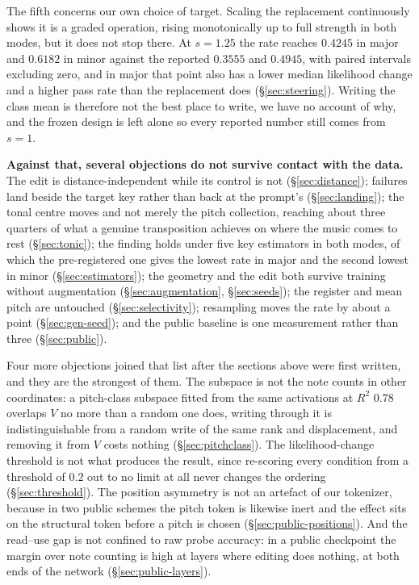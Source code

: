 \documentclass{article}
\begin{document}
The fifth concerns our own choice of target. Scaling the replacement continuously shows
it is a graded operation, rising monotonically up to full strength in both modes, but it
does not stop there. At $s=1.25$ the rate reaches $0.4245$ in major and $0.6182$ in
minor against the reported $0.3555$ and $0.4945$, with paired intervals excluding zero,
and in major that point also has a lower median likelihood change and a higher pass rate
than the replacement does (\S\ref{sec:steering}). Writing the class mean is therefore
not the best place to write, we have no account of why, and the frozen design is left
alone so every reported number still comes from $s=1$.

\textbf{Against that, several objections do not survive contact with the data.} The
edit is distance-independent while its control is not (\S\ref{sec:distance}); failures
land beside the target key rather than back at the prompt's (\S\ref{sec:landing});
the tonal centre moves and not merely the pitch collection, reaching about
three quarters of what a genuine transposition achieves on where the music comes to
rest (\S\ref{sec:tonic}); the finding holds under five key estimators in both modes, of
which the pre-registered one gives the lowest rate in major and the second lowest in
minor (\S\ref{sec:estimators}); the geometry and the
edit both survive training without augmentation (\S\ref{sec:augmentation},
\S\ref{sec:seeds}); the register and mean pitch are untouched (\S\ref{sec:selectivity});
resampling moves the rate by about a point (\S\ref{sec:gen-seed}); and the public
baseline is one measurement rather than three (\S\ref{sec:public}).

Four more objections joined that list after the sections above were first written, and
they are the strongest of them. The subspace is not the note counts in other
coordinates: a pitch-class subspace fitted from the same activations at $R^2$ $0.78$
overlaps $V$ no more than a random one does, writing through it is indistinguishable
from a random write of the same rank and displacement, and removing it from $V$ costs
nothing (\S\ref{sec:pitchclass}). The likelihood-change threshold is not what produces the
result, since re-scoring every condition from a threshold of $0.2$ out to no limit at
all never changes the ordering (\S\ref{sec:threshold}). The position asymmetry is not an
artefact of our tokenizer, because in two public schemes the pitch token is likewise
inert and the effect sits on the structural token before a pitch is chosen
(\S\ref{sec:public-positions}). And the read--use gap is not confined to raw probe
accuracy: in a public checkpoint the margin over note counting is high at layers where
editing does nothing, at both ends of the network (\S\ref{sec:public-layers}).
\end{document}
